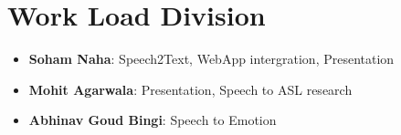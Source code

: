 \documentclass[14pt,a4paper]{article}
\begin{document}
\section{Work Load Division}
\begin{itemize}
	\item \textbf{Soham Naha}: Speech2Text, WebApp intergration, Presentation
	\item \textbf{Mohit Agarwala}: Presentation, Speech to ASL research
	\item \textbf{Abhinav Goud Bingi}: Speech to Emotion
\end{itemize}

\newpage
\printbibliography %
\end{document}
